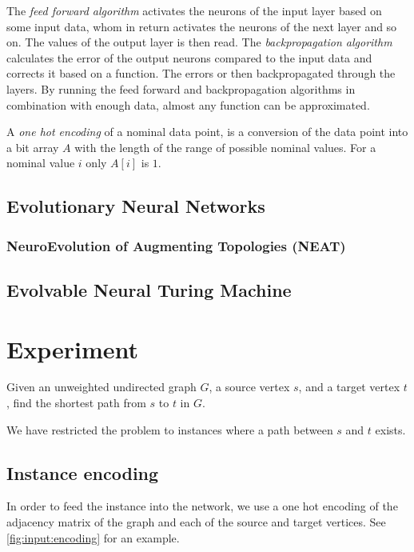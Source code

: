 \documentclass{article}
\begin{document}
The \textit{feed forward algorithm} activates the neurons of the input layer based on some input data, whom in return activates the neurons of the next layer and so on. The values of the output layer is then read. The \textit{backpropagation algorithm} calculates the error of the output neurons compared to the input data and corrects it based on a function. The errors or then backpropagated through the layers. By running the feed forward and backpropagation algorithms in combination with enough data, almost any function can be approximated.

A \textit{one hot encoding} of a nominal data point, is a conversion of the data point into a bit array $ A $ with the length of the range of possible nominal values. For a nominal value $ i $ only $ A[i] $ is $ 1 $.  

\subsection{Evolutionary Neural Networks}

\subsubsection{NeuroEvolution of Augmenting Topologies (NEAT)}

\subsection{Evolvable Neural Turing Machine}

\section{Experiment}
Given an unweighted undirected graph $G$, a source vertex $s$, and a target vertex $t$, find the shortest path from $s$ to $t$ in $G$.

We have restricted the problem to instances where a path between $s$ and $t$ exists.

\subsection{Instance encoding}
In order to feed the instance into the network, we use a one hot encoding of the adjacency matrix of the graph and each of the source and target vertices. See \autoref{fig:input:encoding} for an example.
\end{document}
